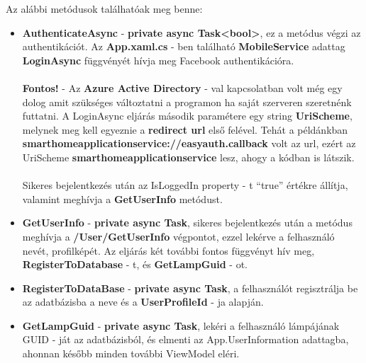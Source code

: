\documentclass[a4paper,12pt]{report}
\begin{document}
    Az alábbi metódusok találhatóak meg benne:

\begin{itemize}
    \item \textbf{AuthenticateAsync} - \textbf{private async Task<bool>}, ez a metódus végzi az authentikációt. Az \textbf{App.xaml.cs} - ben
    található \textbf{MobileService} adattag \textbf{LoginAsync} függvényét hívja meg Facebook authentikációra. \\
    \\\textbf{Fontos!} - Az \textbf{Azure Active Directory} - val kapcsolatban volt még egy dolog amit szükséges változtatni a programon ha saját
    szerveren szeretnénk futtatni. A LoginAsync eljárás második paramétere egy string \textbf{UriScheme}, melynek meg kell egyeznie
    a \textbf{redirect url} első felével. Tehát a példánkban \textbf{smarthomeapplicationservice://easyauth.callback} volt az url,
    ezért az UriScheme \textbf{smarthomeapplicationservice} lesz, ahogy a kódban is látszik.\\
    \\Sikeres bejelentkezés után az IsLoggedIn property - t ``true'' értékre állítja, valamint meghívja a \textbf{GetUserInfo} metódust.
    \item \textbf{GetUserInfo} - \textbf{private async Task}, sikeres bejelentkezés után a metódus meghívja a \textbf{/User/GetUserInfo} végpontot,
    ezzel lekérve a felhasználó nevét, profilképét. Az eljárás két további fontos függvényt hív meg, \textbf{RegisterToDatabase} - t, és \textbf{GetLampGuid} - ot.
    \item \textbf{RegisterToDataBase} - \textbf{private async Task}, a felhasználót regisztrálja be az adatbázisba a neve és a \textbf{UserProfileId} - ja alapján.
    \item \textbf{GetLampGuid} - \textbf{private async Task}, lekéri a felhasználó lámpájának GUID - ját az adatbázisból, és elmenti
    az App.UserInformation adattagba, ahonnan később minden további ViewModel eléri.
\end{itemize}
\end{document}
